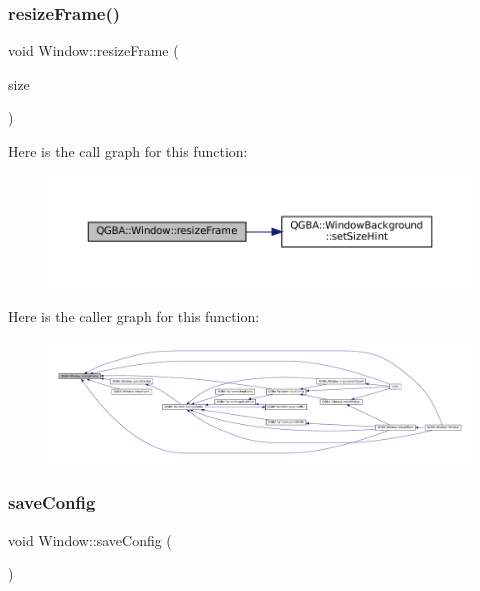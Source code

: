 \subsubsection{\texorpdfstring{resize\+Frame()}{resizeFrame()}}
{\footnotesize\ttfamily void Window\+::resize\+Frame (\begin{DoxyParamCaption}\item[{const Q\+Size \&}]{size }\end{DoxyParamCaption})}

Here is the call graph for this function\+:
\nopagebreak
\begin{figure}[H]
\begin{center}
\leavevmode
\includegraphics[width=350pt]{class_q_g_b_a_1_1_window_a6486c6d4704a8b38ee542611f1ca97fc_cgraph}
\end{center}
\end{figure}
Here is the caller graph for this function\+:
\nopagebreak
\begin{figure}[H]
\begin{center}
\leavevmode
\includegraphics[width=350pt]{class_q_g_b_a_1_1_window_a6486c6d4704a8b38ee542611f1ca97fc_icgraph}
\end{center}
\end{figure}
\mbox{\label{class_q_g_b_a_1_1_window_a9d31b6bc2ec42e500c9fa6370ec89f52}} 
\subsubsection{\texorpdfstring{save\+Config}{saveConfig}}
{\footnotesize\ttfamily void Window\+::save\+Config (\begin{DoxyParamCaption}{ }\end{DoxyParamCaption})\hspace{0.3cm}{\ttfamily [slot]}}

